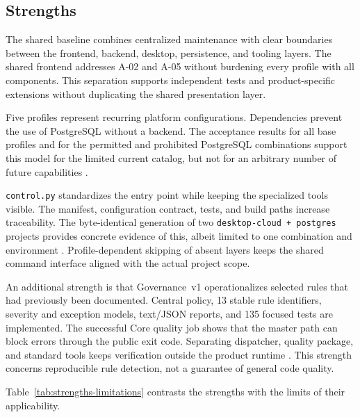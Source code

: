 \subsection{Strengths}
\label{subsec:staerken}

The shared baseline combines centralized maintenance with clear boundaries
between the frontend, backend, desktop, persistence, and tooling layers. The
shared frontend addresses A-02 and A-05 without burdening every profile with
all components. This separation supports independent tests and
product-specific extensions without duplicating the shared presentation layer.

Five profiles represent recurring platform configurations. Dependencies
prevent the use of PostgreSQL without a backend. The acceptance results for
all base profiles and for the permitted and prohibited PostgreSQL combinations
support this model for the limited current catalog, but not for an arbitrary
number of future capabilities \parencite{kleiveist2026acceptance}.

\texttt{control.py} standardizes the entry point while keeping the specialized
tools visible. The manifest, configuration contract, tests, and build paths
increase traceability. The byte-identical generation of two
\texttt{desktop-cloud + postgres} projects provides concrete evidence of this,
albeit limited to one combination and environment
\parencite{kleiveist2026acceptance}.
Profile-dependent skipping of absent layers keeps the shared command interface
aligned with the actual project scope.

An additional strength is that Governance~v1 operationalizes selected rules
that had previously been documented. Central policy, 13 stable rule
identifiers, severity and exception models, text/JSON reports, and 135 focused
tests are implemented. The successful Core quality job shows that the master
path can block errors through the public exit code. Separating dispatcher,
quality package, and standard tools keeps verification outside the product
runtime
\parencite{kleiveist2026quality-implementation,kleiveist2026governance-core-run}.
This strength concerns reproducible rule detection, not a guarantee of general
code quality.

Table~\ref{tab:strengths-limitations} contrasts the strengths with the limits
of their applicability.


